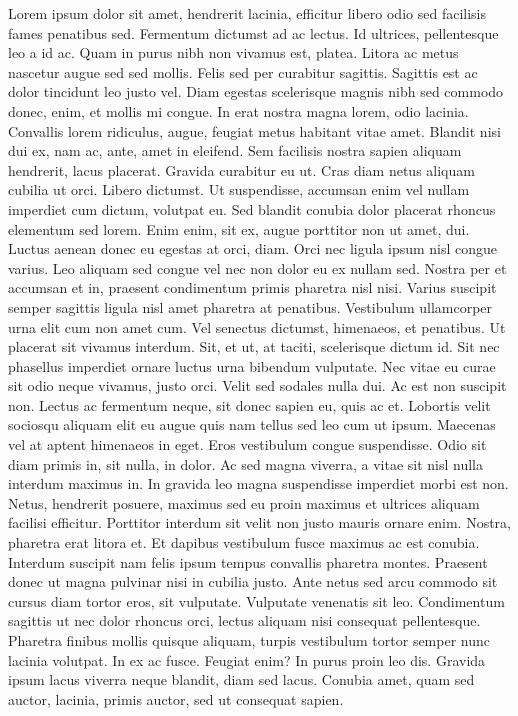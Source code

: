 \documentclass[
  12pt,
]{article}
\begin{document}
Lorem ipsum dolor sit amet, hendrerit lacinia, efficitur libero odio sed facilisis fames penatibus sed. Fermentum dictumst ad ac lectus. Id ultrices, pellentesque leo a id ac. Quam in purus nibh non vivamus est, platea. Litora ac metus nascetur augue sed sed mollis. Felis sed per curabitur sagittis. Sagittis est ac dolor tincidunt leo justo vel. Diam egestas scelerisque magnis nibh sed commodo donec, enim, et mollis mi congue. In erat nostra magna lorem, odio lacinia. Convallis lorem ridiculus, augue, feugiat metus habitant vitae amet. Blandit nisi dui ex, nam ac, ante, amet in eleifend. Sem facilisis nostra sapien aliquam hendrerit, lacus placerat. Gravida curabitur eu ut. Cras diam netus aliquam cubilia ut orci. Libero dictumst. Ut suspendisse, accumsan enim vel nullam imperdiet cum dictum, volutpat eu. Sed blandit conubia dolor placerat rhoncus elementum sed lorem. Enim enim, sit ex, augue porttitor non ut amet, dui. Luctus aenean donec eu egestas at orci, diam. Orci nec ligula ipsum nisl congue varius. Leo aliquam sed congue vel nec non dolor eu ex nullam sed. Nostra per et accumsan et in, praesent condimentum primis pharetra nisl nisi. Varius suscipit semper sagittis ligula nisl amet pharetra at penatibus. Vestibulum ullamcorper urna elit cum non amet cum. Vel senectus dictumst, himenaeos, et penatibus. Ut placerat sit vivamus interdum. Sit, et ut, at taciti, scelerisque dictum id. Sit nec phasellus imperdiet ornare luctus urna bibendum vulputate. Nec vitae eu curae sit odio neque vivamus, justo orci. Velit sed sodales nulla dui. Ac est non suscipit non. Lectus ac fermentum neque, sit donec sapien eu, quis ac et. Lobortis velit sociosqu aliquam elit eu augue quis nam tellus sed leo cum ut ipsum. Maecenas vel at aptent himenaeos in eget. Eros vestibulum congue suspendisse. Odio sit diam primis in, sit nulla, in dolor. Ac sed magna viverra, a vitae sit nisl nulla interdum maximus in. In gravida leo magna suspendisse imperdiet morbi est non. Netus, hendrerit posuere, maximus sed eu proin maximus et ultrices aliquam facilisi efficitur. Porttitor interdum sit velit non justo mauris ornare enim. Nostra, pharetra erat litora et. Et dapibus vestibulum fusce maximus ac est conubia. Interdum suscipit nam felis ipsum tempus convallis pharetra montes. Praesent donec ut magna pulvinar nisi in cubilia justo. Ante netus sed arcu commodo sit cursus diam tortor eros, sit vulputate. Vulputate venenatis sit leo. Condimentum sagittis ut nec dolor rhoncus orci, lectus aliquam nisi consequat pellentesque. Pharetra finibus mollis quisque aliquam, turpis vestibulum tortor semper nunc lacinia volutpat. In ex ac fusce. Feugiat enim? In purus proin leo dis. Gravida ipsum lacus viverra neque blandit, diam sed lacus. Conubia amet, quam sed auctor, lacinia, primis auctor, sed ut consequat sapien.
\end{document}
